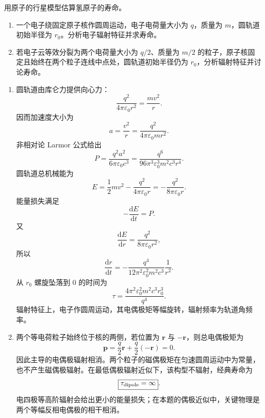 \begin{question}[经典氢原子寿命]
用原子的行星模型估算氢原子的寿命。
\begin{enumerate}
  \item 一个电子绕固定原子核作圆周运动，电子电荷量大小为 $q$，质量为 $m$，圆轨道初始半径为 $r_0$。分析电子辐射特征并求寿命。
  \item 若电子云等效分裂为两个电荷量大小为 $q/2$、质量为 $m/2$ 的粒子，原子核固定且始终在两个粒子连线中点处，圆轨道初始半径仍为 $r_0$，分析辐射特征并讨论寿命。
\end{enumerate}
\begin{solution}
\begin{enumerate}
  \item 圆轨道由库仑力提供向心力：
  \[
    \frac{q^2}{4\pi\varepsilon_0r^2}=\frac{mv^2}{r} .
  \]
  因而加速度大小为
  \[
    a=\frac{v^2}{r}=\frac{q^2}{4\pi\varepsilon_0mr^2} .
  \]
  非相对论 Larmor 公式给出
  \[
    P=\frac{q^2a^2}{6\pi\varepsilon_0c^3}
    =\frac{q^6}{96\pi^3\varepsilon_0^3m^2c^3r^4} .
  \]
  圆轨道总机械能为
  \[
    E=\frac12mv^2-\frac{q^2}{4\pi\varepsilon_0r}
    =-\frac{q^2}{8\pi\varepsilon_0r} .
  \]
  能量损失满足
  \[
    -\frac{\mathrm dE}{\mathrm dt}=P .
  \]
  又
  \[
    \frac{\mathrm dE}{\mathrm dr}=\frac{q^2}{8\pi\varepsilon_0r^2},
  \]
  所以
  \[
    \frac{\mathrm dr}{\mathrm dt}
    =-\frac{q^4}{12\pi^2\varepsilon_0^2m^2c^3}\frac1{r^2} .
  \]
  从 $r_0$ 螺旋坠落到 $0$ 的时间为
  \[
    \boxed{\tau=\frac{4\pi^2\varepsilon_0^2m^2c^3r_0^3}{q^4}} .
  \]
  辐射特征上，电子作圆周运动，其电偶极矩等幅旋转，辐射频率为轨道角频率。

  \item 两个等电荷粒子始终位于核的两侧，若位置为 $\mathbf r$ 与 $-\mathbf r$，则总电偶极矩为
  \[
    \mathbf p=\frac{q}{2}\mathbf r+\frac{q}{2}(-\mathbf r)=0 .
  \]
  因此主导的电偶极辐射相消。两个粒子的磁偶极矩在匀速圆周运动中为常量，也不产生磁偶极辐射。在最低偶极辐射近似下，该构型不辐射，经典寿命为
  \[
    \boxed{\tau_{\rm dipole}=\infty} .
  \]
  电四极等高阶辐射会给出更小的能量损失；在本题的偶极近似中，关键物理是两个等幅反相电偶极的相干相消。
\end{enumerate}
\end{solution}
\end{question}
